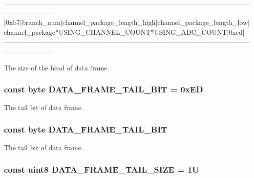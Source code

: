 \begin{DoxyVerb}---------------------------------------------------------------------------------------------------------------------------------
|0xb7|branch_num|channel_package_length_high|channel_package_length_low|channel_package*USING_CHANNEL_COUNT*USING_ADC_COUNT|0xed|
---------------------------------------------------------------------------------------------------------------------------------
\end{DoxyVerb}
The size of the head of data frame. \hypertarget{group___a_r_m_const_ga9c17d44ef7be0dfaa3d9d42a1e1224c7}{
\subsubsection[{D\-A\-T\-A\-\_\-\-F\-R\-A\-M\-E\-\_\-\-T\-A\-I\-L\-\_\-\-B\-I\-T}]{\setlength{\rightskip}{0pt plus 5cm}const byte D\-A\-T\-A\-\_\-\-F\-R\-A\-M\-E\-\_\-\-T\-A\-I\-L\-\_\-\-B\-I\-T = 0x\-E\-D}}\label{group___a_r_m_const_ga9c17d44ef7be0dfaa3d9d42a1e1224c7}
The tail bit of data frame. \hypertarget{group___a_r_m_const_ga9c17d44ef7be0dfaa3d9d42a1e1224c7}{
\subsubsection[{D\-A\-T\-A\-\_\-\-F\-R\-A\-M\-E\-\_\-\-T\-A\-I\-L\-\_\-\-B\-I\-T}]{\setlength{\rightskip}{0pt plus 5cm}const byte D\-A\-T\-A\-\_\-\-F\-R\-A\-M\-E\-\_\-\-T\-A\-I\-L\-\_\-\-B\-I\-T}}\label{group___a_r_m_const_ga9c17d44ef7be0dfaa3d9d42a1e1224c7}
The tail bit of data frame. \hypertarget{group___a_r_m_const_gae0773875f4d5422a0c8f39a7e496ab94}{
\subsubsection[{D\-A\-T\-A\-\_\-\-F\-R\-A\-M\-E\-\_\-\-T\-A\-I\-L\-\_\-\-S\-I\-Z\-E}]{\setlength{\rightskip}{0pt plus 5cm}const uint8 D\-A\-T\-A\-\_\-\-F\-R\-A\-M\-E\-\_\-\-T\-A\-I\-L\-\_\-\-S\-I\-Z\-E = 1\-U}}\label{group___a_r_m_const_gae0773875f4d5422a0c8f39a7e496ab94}
